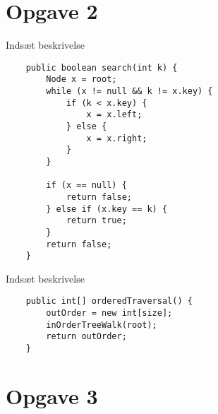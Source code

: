 \documentclass{article}
\begin{document}
\section*{Opgave 2}
Indsæt beskrivelse
\begin{lstlisting}
	public boolean search(int k) {
        Node x = root;
        while (x != null && k != x.key) {
            if (k < x.key) {
                x = x.left;
            } else {
                x = x.right;
            }
        }

        if (x == null) {
            return false;
        } else if (x.key == k) {
            return true;
        }
        return false;
    }
\end{lstlisting}
Indsæt beskrivelse
\begin{lstlisting}
	public int[] orderedTraversal() {
        outOrder = new int[size];
        inOrderTreeWalk(root);
        return outOrder;
    }
\end{lstlisting}
\newpage
\section*{Opgave 3}
\end{document}

